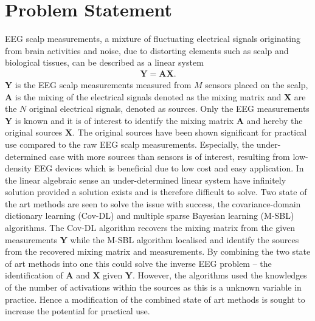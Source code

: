 \chapter{Problem Statement}\label{ch:problemstatement}
EEG scalp measurements, a mixture of fluctuating electrical signals originating from brain activities and noise, due to distorting elements such as scalp and biological tissues, can be described as a linear system
\begin{align*}
\mathbf{Y} = \mathbf{AX}.
\end{align*}
$\mathbf{Y}$ is the EEG scalp measurements measured from $M$ sensors placed on the scalp, $\mathbf{A}$ is the mixing of the electrical signals denoted as the mixing matrix and $\mathbf{X}$ are the $N$ original electrical signals, denoted as sources. 
Only the EEG measurements $\mathbf{Y}$ is known and it is of interest to identify the mixing matrix $\mathbf{A}$ and hereby the original sources $\mathbf{X}$. The original sources have been shown significant for practical use compared to the raw EEG scalp measurements. 
Especially, the under-determined case with more sources than sensors is of interest, resulting from low-density EEG devices which is beneficial due to low cost and easy application. 
In the linear algebraic sense an under-determined linear system have infinitely solution provided a solution exists and is therefore difficult to solve.
Two state of the art methods are seen to solve the issue with success, the covariance-domain dictionary learning (Cov-DL) and multiple sparse Bayesian learning (M-SBL) algorithms. 
The Cov-DL algorithm recovers the mixing matrix from the given measurements $\mathbf{Y}$ while the M-SBL algorithm localised and identify the sources from the recovered mixing matrix and measurements. 
By combining the two state of art methods into one this could solve the inverse EEG problem -- the identification of $\mathbf{A}$ and $\mathbf{X}$ given $\mathbf{Y}$.
However, the algorithms used the knowledges of the number of activations within the sources as this is a unknown variable in practice. Hence a modification of the combined state of art methods is sought to increase the potential for practical use.


